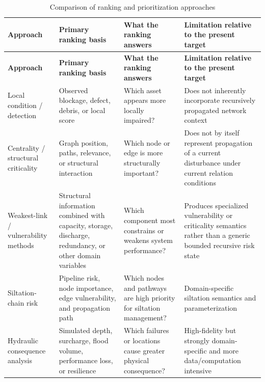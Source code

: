 {\small
\renewcommand{\arraystretch}{1.15}
\begin{longtable}{@{}>{\raggedright\arraybackslash}p{0.20\dimexpr\linewidth-6\tabcolsep\relax}
                     >{\raggedright\arraybackslash}p{0.27\dimexpr\linewidth-6\tabcolsep\relax}
                     >{\raggedright\arraybackslash}p{0.27\dimexpr\linewidth-6\tabcolsep\relax}
                     >{\raggedright\arraybackslash}p{0.26\dimexpr\linewidth-6\tabcolsep\relax}@{}}
\caption{Comparison of ranking and prioritization approaches}\label{tab:ranking-approaches}\\
\toprule
\textbf{Approach} & \textbf{Primary ranking basis} & \textbf{What the ranking answers} & \textbf{Limitation relative to the present target} \\
\midrule
\endfirsthead
\toprule
\textbf{Approach} & \textbf{Primary ranking basis} & \textbf{What the ranking answers} & \textbf{Limitation relative to the present target} \\
\midrule
\endhead
\bottomrule
\endlastfoot

Local condition / detection~\citep{iqbal2021,vandaele2024,patil2023} &
Observed blockage, defect, debris, or local score &
Which asset appears more locally impaired? &
Does not inherently incorporate recursively propagated network context \\
\addlinespace

Centrality / structural criticality~\citep{simone2022,simone2023,reyes2020} &
Graph position, paths, relevance, or structural interaction &
Which node or edge is more structurally important? &
Does not by itself represent propagation of a current disturbance under current relation conditions \\
\addlinespace

Weakest-link / vulnerability methods~\citep{dastgir2023,meijer2023} &
Structural information combined with capacity, storage, discharge, redundancy, or other domain variables &
Which component most constrains or weakens system performance? &
Produces specialized vulnerability or criticality semantics rather than a generic bounded recursive risk state \\
\addlinespace

Siltation-chain risk~\citep{zhang2025} &
Pipeline risk, node importance, edge vulnerability, and propagation path &
Which nodes and pathways are high priority for siltation management? &
Domain-specific siltation semantics and parameterization \\
\addlinespace

Hydraulic consequence analysis~\citep{dastgir2024,zhang2024} &
Simulated depth, surcharge, flood volume, performance loss, or resilience &
Which failures or locations cause greater physical consequence? &
High-fidelity but strongly domain-specific and more data/computation intensive \\

\end{longtable}
}
